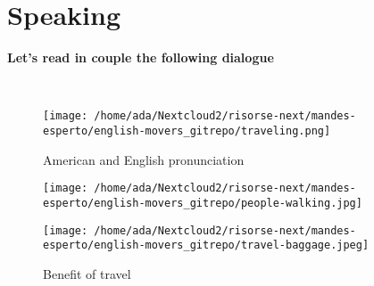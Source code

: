 \documentclass[]{article} %
\begin{document}
\section*{Speaking}



\begin{minipage}[h]{0.99\textwidth}
	
	\begin{question}
		\textbf{Let's read in couple the following dialogue}
	\end{question}
	
	
	\
	\begin{wrapfigure}{r}{0.5\textwidth}


\texttt{[image: /home/ada/Nextcloud2/risorse-next/mandes-esperto/english-movers\_gitrepo/traveling.png]}
\caption {American and English pronunciation}		
\vspace{3cm}

\texttt{[image: /home/ada/Nextcloud2/risorse-next/mandes-esperto/english-movers\_gitrepo/people-walking.jpg]}
\caption {Benefit of travel}		

\texttt{[image: /home/ada/Nextcloud2/risorse-next/mandes-esperto/english-movers\_gitrepo/travel-baggage.jpeg]}

	\end{wrapfigure}
	
	
	

\end{minipage}
\end{document}
